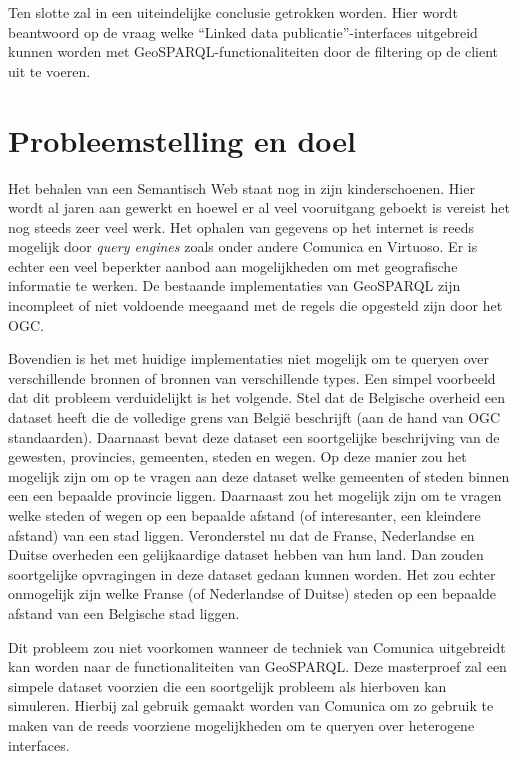 Ten slotte zal in  een uiteindelijke conclusie getrokken worden. Hier wordt beantwoord op de vraag welke ``Linked data publicatie''-interfaces uitgebreid kunnen worden met GeoSPARQL-functionaliteiten door de filtering op de client uit te voeren.


\section{Probleemstelling en doel}
\label{sec:probleemstelling_doel}
Het behalen van een Semantisch Web staat nog in zijn kinderschoenen. Hier wordt al jaren aan gewerkt en hoewel er al veel vooruitgang geboekt is vereist het nog steeds zeer veel werk. Het ophalen van gegevens op het internet is reeds mogelijk door \textit{query engines} zoals onder andere Comunica en Virtuoso. Er is echter een veel beperkter aanbod aan mogelijkheden om met geografische informatie te werken. De bestaande implementaties van GeoSPARQL zijn incompleet of niet voldoende meegaand met de regels die opgesteld zijn door het OGC. 

Bovendien is het met huidige implementaties niet mogelijk om te queryen over verschillende bronnen of bronnen van verschillende types. Een simpel voorbeeld dat dit probleem verduidelijkt is het volgende. Stel dat de Belgische overheid een dataset heeft die de volledige grens van België beschrijft (aan de hand van OGC standaarden). Daarnaast bevat deze dataset een soortgelijke beschrijving van de gewesten, provincies, gemeenten, steden en wegen. Op deze manier zou het mogelijk zijn om op te vragen aan deze dataset welke gemeenten of steden binnen een een bepaalde provincie liggen. Daarnaast zou het mogelijk zijn om te vragen welke steden of wegen op een bepaalde afstand (of interesanter, een kleindere afstand) van een stad liggen. Veronderstel nu dat de Franse, Nederlandse en Duitse overheden een gelijkaardige dataset hebben van hun land. Dan zouden soortgelijke opvragingen in deze dataset gedaan kunnen worden. Het zou echter onmogelijk zijn welke Franse (of Nederlandse of Duitse) steden op een bepaalde afstand van een Belgische stad liggen. 

Dit probleem zou niet voorkomen wanneer de techniek van Comunica uitgebreidt kan worden naar de functionaliteiten van GeoSPARQL. Deze masterproef zal een simpele dataset voorzien die een soortgelijk probleem als hierboven kan simuleren. Hierbij zal gebruik gemaakt worden van Comunica om zo gebruik te maken van de reeds voorziene mogelijkheden om te queryen over heterogene interfaces. 


